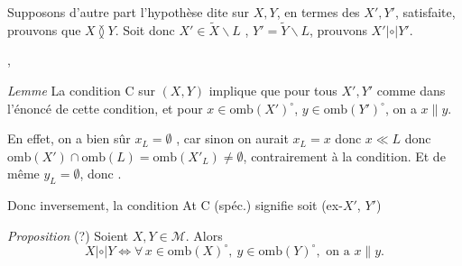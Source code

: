 \documentclass[11pt,a4paper]{article}
\begin{document}
Supposons d'autre part l'hypothèse dite sur $X, Y$, en termes des $X', Y'$, satisfaite, prouvons que $X \between Y$. Soit donc $X' \in \widetilde{X} \smallsetminus L$ \struck{\ill{}}, $Y' = \widetilde{Y} \smallsetminus L$, prouvons $X' \mathrel{|{\circ}|} Y'$.

  \ill{}, \ill{}


\emph{Lemme} La condition C sur $(X, Y)$ implique que pour tous $X', Y'$ comme dans l'énoncé de cette condition, et pour $x \in \mathrm{omb}(X')^{\circ}$, $y \in \mathrm{omb}(Y')^{\circ}$, on a $x \parallel y$.

En effet, on a bien sûr  $x_L = \emptyset$ , car sinon on aurait $x_L = x$ donc $x \ll L$  donc $\mathrm{omb}(X') \cap \mathrm{omb}(L) = \mathrm{omb}(X'_L) \neq \emptyset$, contrairement à  la condition. Et de même $y_L = \emptyset$, donc \ill{}.

Donc inversement, la condition At C (spéc.) signifie     soit (ex-$X'$, $Y'$) 

\emph{Proposition} (?) Soient $X, Y \in \mathcal{M}$. Alors
\[
  X \mathrel{|{\circ}|} Y \Longleftrightarrow \forall\, x \in \mathrm{omb}(X)^{\circ},\ y \in \mathrm{omb}(Y)^{\circ}, \text{ on a } x \parallel y .
\]
\end{document}
